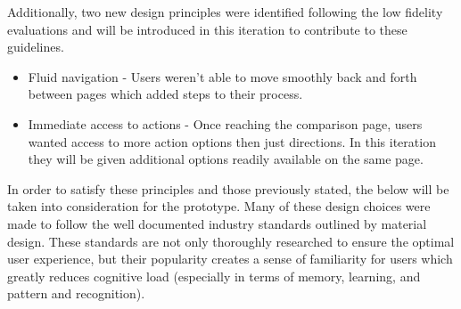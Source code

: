 \documentclass[a4 paper, 12pt]{article}
\begin{document}
    Additionally, two new design principles were identified following the low fidelity evaluations and will be introduced in this iteration to contribute to these guidelines. 
        \begin{itemize}
            \item Fluid navigation - Users weren't able to move smoothly back and forth between pages which added steps to their process. 
            \item Immediate access to actions - Once reaching the comparison page, users wanted access to more action options then just directions. In this iteration they will be given additional options readily available on the same page.
        \end{itemize}

    In order to satisfy these principles and those previously stated, the below will be taken into consideration for the prototype. Many of these design choices were made to follow the well documented industry standards outlined by material design. These standards are not only thoroughly researched to ensure the optimal user experience, but their popularity creates a sense of familiarity for users which greatly reduces cognitive load (especially in terms of memory, learning, and pattern and recognition). 
\end{document}
